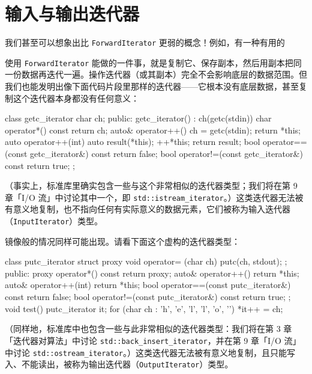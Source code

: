 \section{输入与输出迭代器}

我们甚至可以想象出比 \texttt{Forward\allowbreak{}Iterator} 更弱的概念！例如，有一种有用的

使用 \texttt{Forward\allowbreak{}Iterator} 能做的一件事，就是复制它、保存副本，然后用副本把同一份数据再迭代一遍。操作迭代器（或其副本）完全不会影响底层的数据范围。但我们也能发明出像下面代码片段里那样的迭代器——它根本没有底层数据，甚至复制这个迭代器本身都没有任何意义：

\begin{codebox}[cpp]
    class getc_iterator {
      char ch;
    public:
      getc_iterator() : ch(getc(stdin)) {}
      char operator*() const { return ch; }
      auto& operator++() { ch = getc(stdin); return *this; }
      auto operator++(int) { auto result(*this); ++*this; return result; }
      bool operator==(const getc_iterator&) const { return false; }
      bool operator!=(const getc_iterator&) const { return true; }
    };
\end{codebox}

（事实上，标准库里确实包含一些与这个非常相似的迭代器类型；我们将在第 9 章「I/O 流」中讨论其中一个，即 \texttt{std::\allowbreak{}istream\_\allowbreak{}iterator}。）这类迭代器无法被有意义地复制，也不指向任何有实际意义的数据元素，它们被称为输入迭代器（\texttt{Input\allowbreak{}Iterator}）类型。

镜像般的情况同样可能出现。请看下面这个虚构的迭代器类型：

\begin{codebox}[cpp]
    class putc_iterator {
      struct proxy {
        void operator= (char ch) { putc(ch, stdout); }
      };
    public:
      proxy operator*() const { return proxy{}; }
      auto& operator++() { return *this; }
      auto& operator++(int) { return *this; }
      bool operator==(const putc_iterator&) const { return false; }
      bool operator!=(const putc_iterator&) const { return true; }
    };
    void test()
    {
      putc_iterator it;
      for (char ch : {'h', 'e', 'l', 'l', 'o', '\n'}) {
        *it++ = ch;
      }
    }
\end{codebox}

（同样地，标准库中也包含一些与此非常相似的迭代器类型：我们将在第 3 章「迭代器对算法」中讨论 \texttt{std::\allowbreak{}back\_\allowbreak{}insert\_\allowbreak{}iterator}，并在第 9 章「I/O 流」中讨论 \texttt{std::\allowbreak{}ostream\_\allowbreak{}iterator}。）这类迭代器无法被有意义地复制，且只能写入、不能读出，被称为输出迭代器（\texttt{Output\allowbreak{}Iterator}）类型。

